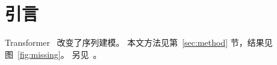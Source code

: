 \section{引言}\label{sec:intro}
Transformer~\cite{vaswani2017attention} 改变了序列建模。
本文方法见第~\ref{sec:method} 节，结果见图~\ref{fig:missing}。%
另见~\cite{nobody2099}。%
